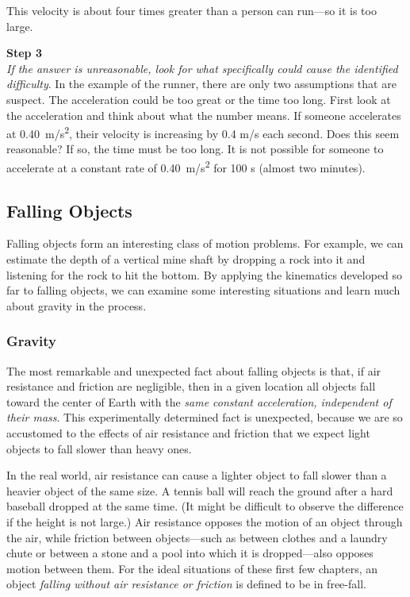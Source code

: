 \documentclass[../../main-ap-physics.tex]{subfiles}
\begin{document}
This velocity is about four times greater than a person can run---so it is too large.

\vspace{1em}

\textbf{Step 3}\\
\textit{If the answer is unreasonable, look for what specifically could cause the identified difficulty}. In the example of the runner, there are only two assumptions that are suspect. The acceleration could be too great or the time too long. First look at the acceleration and think about what the number means. If someone accelerates at \SI{0.40}{m/s^2}, their velocity is increasing by 0.4 m/s each second. Does this seem reasonable? If so, the time must be too long. It is not possible for someone to accelerate at a constant rate of \SI{0.40}{m/s^2} for 100 s (almost two minutes).

\subsection{Falling Objects}

Falling objects form an interesting class of motion problems. For example, we can estimate the depth of a vertical mine shaft by dropping a rock into it and listening for the rock to hit the bottom. By applying the kinematics developed so far to falling objects, we can examine some interesting situations and learn much about gravity in the process.

\subsubsection*{Gravity}

The most remarkable and unexpected fact about falling objects is that, if air resistance and friction are negligible, then in a given location all objects fall toward the center of Earth with the \textit{same constant acceleration, independent of their mass}. This experimentally determined fact is unexpected, because we are so accustomed to the effects of air resistance and friction that we expect light objects to fall slower than heavy ones.

\vspace{1em} %

In the real world, air resistance can cause a lighter object to fall slower than a heavier object of the same size. A tennis ball will reach the ground after a hard baseball dropped at the same time. (It might be difficult to observe the difference if the height is not large.) Air resistance opposes the motion of an object through the air, while friction between objects---such as between clothes and a laundry chute or between a stone and a pool into which it is dropped---also opposes motion between them. For the ideal situations of these first few chapters, an object \textit{falling without air resistance or friction} is defined to be in \gls{free-fall}.
\end{document}
